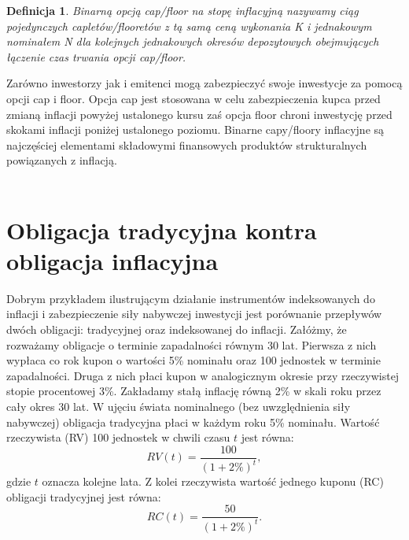 \documentclass{mini}
\theoremstyle{mythstyle}
\newtheorem{Definicja}{Definicja}[chapter]
\begin{document}
	\begin{Definicja}
		Binarną opcją cap/floor na stopę inflacyjną nazywamy ciąg pojedynczych capletów/flooretów z tą samą ceną wykonania K i jednakowym nominałem N dla kolejnych jednakowych okresów depozytowych obejmujących łączenie czas trwania opcji cap/floor.
	\end{Definicja}

	Zarówno inwestorzy jak i emitenci mogą zabezpieczyć swoje inwestycje za pomocą opcji cap i floor. Opcja cap jest stosowana w celu zabezpieczenia kupca przed zmianą inflacji powyżej ustalonego kursu zaś opcja floor chroni inwestycję przed skokami inflacji poniżej ustalonego poziomu. Binarne capy/floory inflacyjne są najczęściej elementami składowymi finansowych produktów strukturalnych powiązanych z inflacją.\\\\
	
	\section{Obligacja tradycyjna kontra obligacja inflacyjna}
	
	Dobrym przykładem ilustrującym działanie instrumentów indeksowanych do inflacji i zabezpieczenie siły nabywczej inwestycji jest porównanie przepływów dwóch obligacji: tradycyjnej oraz indeksowanej do inflacji. Załóżmy, że rozważamy obligacje o terminie zapadalności równym 30 lat. Pierwsza z nich wypłaca co rok kupon o wartości 5\% nominału oraz 100 jednostek w terminie zapadalności. Druga z nich płaci kupon w analogicznym okresie przy rzeczywistej stopie procentowej 3\%. Zakładamy stałą inflację równą 2\% w skali roku przez cały okres 30 lat.
	W ujęciu świata nominalnego (bez uwzględnienia siły nabywczej) obligacja tradycyjna płaci w każdym roku 5\% nominału. Wartość rzeczywista (RV) 100 jednostek w chwili czasu $t$ jest równa:
	\begin{equation*}
		RV(t) = \frac{100}{(1+2\%)^t},
	\end{equation*}
	gdzie $t$ oznacza kolejne lata. Z kolei rzeczywista wartość jednego kuponu (RC) obligacji tradycyjnej jest równa:
	\begin{equation*}
	RC(t) = \frac{50}{(1+2\%)^t}.
	\end{equation*}
	
\end{document}
